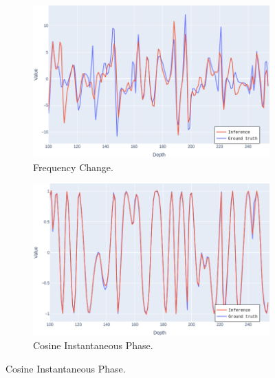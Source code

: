 \documentclass[conference]{IEEEtran}
\begin{document}
\begin{figure}[!t]
     \centering
     \begin{subfigure}[b]{0.49\textwidth}%
        \includegraphics[width=1.0\columnwidth]{Fig/FrequencyChangeLine.png}
        \caption{
        Frequency Change.}
        \label{fig:fline}
     \end{subfigure}
     \begin{subfigure}[b]{0.49\textwidth}%
        \includegraphics[width=1.0\columnwidth]{Fig/CosineInstantaneousPhaseLine.png}
        \caption{
        Cosine Instantaneous Phase.
        }
        \label{fig:cline}
     \end{subfigure}
     

\end{figure}
\end{document}
